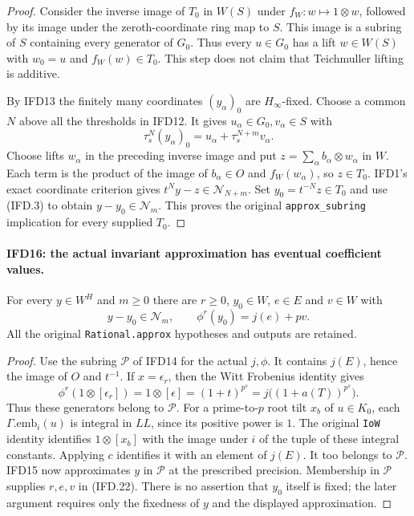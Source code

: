 \begin{proof}
Consider the inverse image of $T_0$ in $W(S)$ under
$f_W:w\mapsto1\otimes w$, followed by its image under the
zeroth-coordinate ring map to $S$. This image is a subring of $S$
containing every generator of $G_0$. Thus every $u\in G_0$ has
a lift $w\in W(S)$ with $w_0=u$ and $f_W(w)\in T_0$.
This step does not claim that Teichmuller lifting is additive.

By IFD13 the finitely many coordinates $(y_\alpha)_0$ are
$H_\infty$-fixed. Choose a common $N$ above all the thresholds
in IFD12. It gives $u_\alpha\in G_0,v_\alpha\in S$ with
\[
       \tau_s^N(y_\alpha)_0
                      =u_\alpha+\tau_s^{N+m}v_\alpha.
\]
Choose lifts $w_\alpha$ in the preceding inverse image and put
$z=\sum_\alpha b_\alpha\otimes w_\alpha$ in $W$.
Each term is the product of the image of $b_\alpha\in O$ and
$f_W(w_\alpha)$, so $z\in T_0$. IFD1's exact coordinate
criterion gives $t^Ny-z\in\mathcal N_{N+m}$.
Set $y_0=t^{-N}z\in T_0$ and use (IFD.3) to obtain
$y-y_0\in\mathcal N_m$. This proves the original
\texttt{approx\_subring} implication for every supplied $T_0$.
\end{proof}

\paragraph{IFD16: the actual invariant approximation has eventual coefficient values.}
\label{claim:IFD16}
For every $y\in W^H$ and $m\geq0$ there are $r\geq0$,
$y_0\in W$, $e\in E$ and $v\in W$ with
\[
          y-y_0\in\mathcal N_m,\qquad \phi^r(y_0)=j(e)+pv.
                                                               \tag{IFD.22}
\]
All the original \texttt{Rational.approx} hypotheses and outputs
are retained.

\begin{proof}
Use the subring $\mathcal P$ of IFD14 for the actual $j,\phi$.
It contains $j(E)$, hence the image of $O$ and $t^{-1}$.
If $x=\epsilon_r$, then the Witt Frobenius identity gives
\[
 \phi^r(1\otimes[\epsilon_r])
       =1\otimes[\epsilon]
       =(1+t)^{p^s}=j\bigl((1+a(T))^{p^s}\bigr).
\]
Thus these generators belong to $\mathcal P$.
For a prime-to-$p$ root tilt $x_b$ of $u\in K_0$, each
$\Gamma.\mathrm{emb}_i(u)$ is integral in $LL$, since its positive
power is $1$. The original \texttt{IoW} identity identifies
$1\otimes[x_b]$ with the image under $i$ of the tuple of these
integral constants. Applying $c$ identifies it with an element of
$j(E)$. It too belongs to $\mathcal P$.
IFD15 now approximates $y$ in $\mathcal P$ at the prescribed
precision. Membership in $\mathcal P$ supplies $r,e,v$ in
(IFD.22). There is no assertion that $y_0$ itself is fixed; the
later argument requires only the fixedness of $y$ and the displayed
approximation.
\end{proof}

